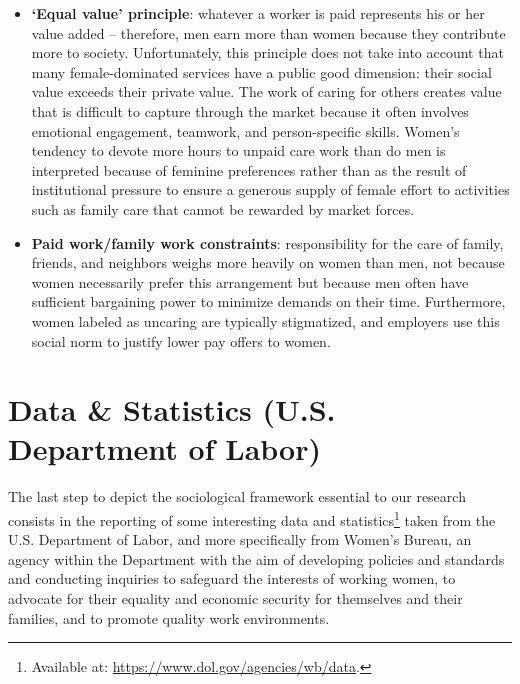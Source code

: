 \begin{itemize}
\item \textbf{`Equal value' principle}: whatever a worker is paid represents his or her value added -- therefore, men earn more than women because they contribute more to society. Unfortunately, this principle does not take into account that many female-dominated services have a public good dimension: their social value exceeds their private value. The work of caring for others creates value that is difficult to capture through the market because it often involves emotional engagement, teamwork, and person-specific skills. Women's tendency to devote more hours to unpaid care work than do men is interpreted because of feminine preferences rather than as the result of institutional pressure to ensure a generous supply of female effort to activities such as family care that cannot be rewarded by market forces.
\item \textbf{Paid work/family work constraints}: responsibility for the care of family, friends, and neighbors weighs more heavily on women than men, not because women necessarily prefer this arrangement but because men often have sufficient bargaining power to minimize demands on their time. Furthermore, women labeled as uncaring are typically stigmatized, and employers use this social norm to justify lower pay offers to women.
\end{itemize}


\section{Data \& Statistics (U.S. Department of Labor)}
\label{section:data_statistics_dol}
The last step to depict the sociological framework essential to our research consists in the reporting of some interesting data and statistics\footnote{Available at: \url{https://www.dol.gov/agencies/wb/data}.} taken from the U.S. Department of Labor, and more specifically from Women's Bureau, an agency within the Department with the aim of developing policies and standards and conducting inquiries to safeguard the interests of working women, to advocate for their equality and economic security for themselves and their families, and to promote quality work environments.


